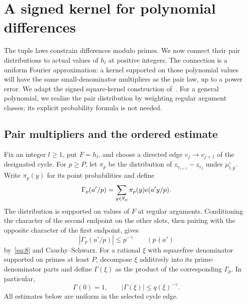 \section{A signed kernel for polynomial differences}
\label{sec:kernel}

The tuple laws constrain differences modulo primes. We now connect their
pair distributions to actual values of $h_l$ at positive integers. The
connection is a uniform Fourier approximation: a kernel supported on those
polynomial values will have the same small-denominator multipliers as the
pair law, up to a power error. We adapt the signed square-kernel construction
of~\cite[Section~6, especially Proposition~6.1]{squarepower}. For a general
polynomial, we realize the pair distribution by weighting regular argument
classes; its explicit probability formula is not needed.

\subsection{Pair multipliers and the ordered estimate}

Fix an integer $l\ge1$, put $F=h_l$, and choose a directed edge
$v_j\to v_{j+1}$ of the designated cycle. For $p\ge P$, let $\pi_p$
be the distribution of $z_{v_{j+1}}-z_{v_j}$ under $\mu_{l,p}^{\circ}$.
Write $\pi_p(y)$ for its point probabilities and define
\[
 \Gamma_p(a'/p)=\sum_{y\in\mathbb F_p}\pi_p(y)e(a'y/p).
\]
The distribution is supported on values of $F$ at regular arguments.
Conditioning the character of the second endpoint on the other slots,
then pairing with the opposite character of the first endpoint, gives
\[
 |\Gamma_p(a'/p)|\le p^{-\gamma}\qquad(p\nmid a')
\]
by~\eqref{eq:8} and Cauchy--Schwarz. For a rational $\xi$ with squarefree
denominator supported on primes at least $P$, decompose $\xi$ additively
into its prime-denominator parts and define $\Gamma(\xi)$ as the product
of the corresponding $\Gamma_p$. In particular,
\begin{equation}
 \Gamma(0)=1,\qquad |\Gamma(\xi)|\le q(\xi)^{-\gamma}.
 \label{eq:15}
\end{equation}
All estimates below are uniform in the selected cycle edge.

